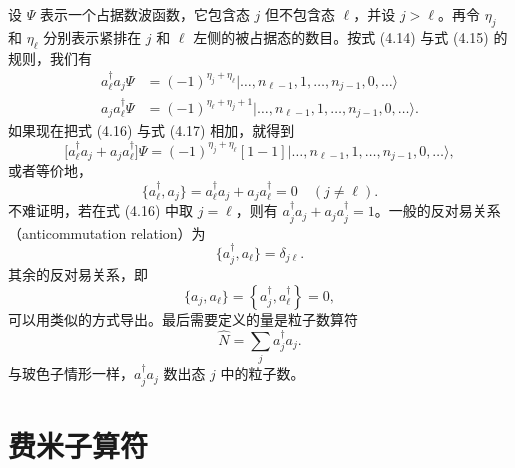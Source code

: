 设 $\Psi$ 表示一个占据数波函数，它包含态 $j$ 但不包含态 $\ell$，并设 $j>\ell$。再令 $\eta_j$ 和 $\eta_\ell$ 分别表示紧排在 $j$ 和 $\ell$ 左侧的被占据态的数目。按式 (4.14) 与式 (4.15) 的规则，我们有
\begin{align*}
a_\ell^\dagger a_j\Psi &= (-1)^{\eta_j+\eta_\ell}|\ldots,n_{\ell-1},1,\ldots,n_{j-1},0,\ldots\rangle
\tag{4.16}\\
a_j a_\ell^\dagger\Psi &= (-1)^{\eta_\ell+\eta_j+1}|\ldots,n_{\ell-1},1,\ldots,n_{j-1},0,\ldots\rangle.
\tag{4.17}
\end{align*}
如果现在把式 (4.16) 与式 (4.17) 相加，就得到
\begin{equation*}
\bigl[a_\ell^\dagger a_j+a_j a_\ell^\dagger\bigr]\Psi=(-1)^{\eta_j+\eta_\ell}[1-1]|\ldots,n_{\ell-1},1,\ldots,n_{j-1},0,\ldots\rangle,
\tag{4.18}
\end{equation*}
或者等价地，
\begin{equation*}
\{a_\ell^\dagger,a_j\}=a_\ell^\dagger a_j+a_j a_\ell^\dagger=0\quad (j\ne\ell).
\tag{4.19}
\end{equation*}
不难证明，若在式 (4.16) 中取 $j=\ell$，则有 $a_j^\dagger a_j+a_j a_j^\dagger=1$。一般的反对易关系（anticommutation relation）为
\begin{equation*}
\{a_j^\dagger,a_\ell\}=\delta_{j\ell}.
\tag{4.20}
\end{equation*}
其余的反对易关系，即
\begin{equation*}
\{a_j,a_\ell\}=\left\{a_j^\dagger,a_\ell^\dagger\right\}=0,
\tag{4.21}
\end{equation*}
可以用类似的方式导出。最后需要定义的量是粒子数算符
\begin{equation*}
\widehat{N}=\sum_j a_j^\dagger a_j.
\tag{4.22}
\end{equation*}
与玻色子情形一样，$a_j^\dagger a_j$ 数出态 $j$ 中的粒子数。

\section{费米子算符}

